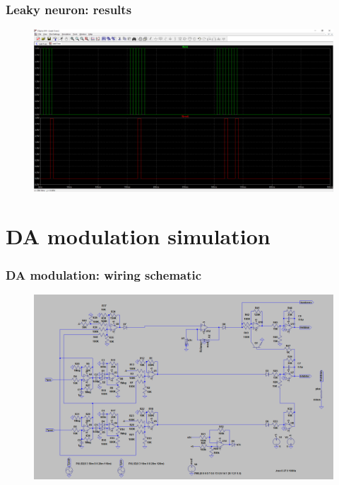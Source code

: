 \documentclass[12pt, aspectratio=169]{beamer}
\begin{document}

\begin{frame}
\frametitle{Leaky neuron: results}
\begin{figure}
\includegraphics[width=0.85\linewidth]{Leak_test}
\end{figure}
\end{frame}

\section{DA modulation simulation}

\begin{frame}
\frametitle{DA modulation: wiring schematic}
\begin{figure}
\includegraphics[width=0.85\linewidth]{da_modulation_sch}
\end{figure}
\end{frame}

\end{document}
